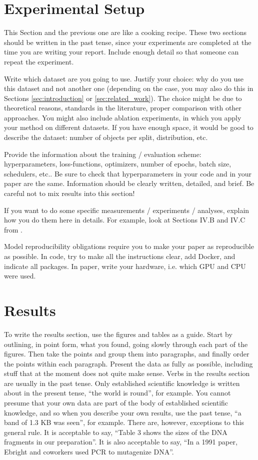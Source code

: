 \documentclass[10pt,conference,compsocconf]{IEEEtran}
\begin{document}
\section{Experimental Setup}\label{sec:experimental_setup}
This Section and the previous one are like a cooking recipe. These two sections should be written in the past tense, since your experiments are completed at the time you are writing your report. Include enough detail so that someone can repeat the experiment. 

Write which dataset are you going to use. Justify your choice: why do you use this dataset and not another one (depending on the case, you may also do this in Sections \ref{sec:introduction} or \ref{sec:related_work}). The choice might be due to theoretical reasons, standards in the literature, proper comparison with other approaches. You might also include ablation experiments, in which you apply your method on different datasets. If you have enough space, it would be good to describe the dataset: number of objects per split, distribution, etc.

Provide the information about the training / evaluation scheme: hyperparameters, loss-functions, optimizers, number of epochs, batch size, schedulers, etc.. Be sure to check that hyperparameters in your code and in your paper are the same. Information should be clearly written, detailed, and brief. Be careful not to mix results into this section!

If you want to do some specific measurements / experiments / analyses, explain how you do them here in details. For example, look at Sections IV.B and IV.C from \cite{grinberg2023rawspectrogram}.

Model reproducibility obligations require you to make your paper as reproducible as possible. In code, try to make all the instructions clear, add Docker, and indicate all packages. In paper, write your hardware, i.e. which GPU and CPU were used. 

\section{Results}\label{sec:results}
To write the results section, use the figures and tables as a guide. Start by outlining, in point form, what you found, going slowly through each part of the figures. Then take the points and group them into paragraphs, and finally order the points within each paragraph. Present the data as fully as possible, including stuff that at the moment does not quite make sense. Verbs in the results section are usually in the past tense. Only established scientific knowledge is written about in the present tense, “the world is round”, for example. You cannot presume
that your own data are part of the body of established scientific knowledge, and so when you describe your own results, use the past tense, “a band of 1.3 KB was seen”, for example. There are, however, exceptions to this general rule. It is acceptable to say, “Table 3 shows the sizes of the DNA fragments in our preparation”. It is also acceptable to say, “In a 1991 paper, Ebright and coworkers used PCR to mutagenize DNA”.
\end{document}
